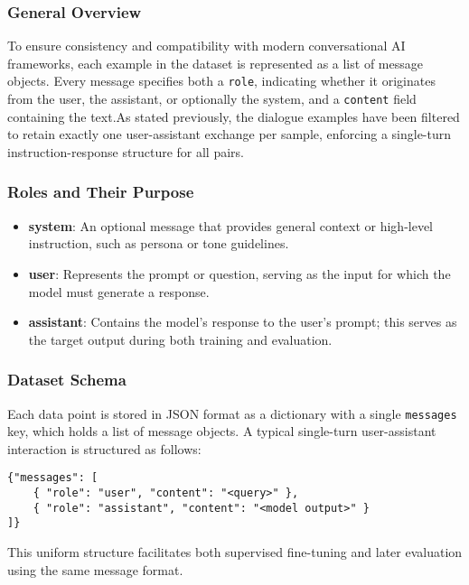 \subsubsection{General Overview}
To ensure consistency and compatibility with modern conversational AI frameworks, each example in the dataset is represented as a list of message objects. Every message specifies both a \texttt{role}, indicating whether it originates from the user, the assistant, or optionally the system, and a \texttt{content} field containing the text.As stated previously, the dialogue examples have been filtered to retain exactly one user-assistant exchange per sample, enforcing a single-turn instruction-response structure for all pairs.

\subsubsection{Roles and Their Purpose}
\begin{itemize}
\item \textbf{system}: An optional message that provides general context or high-level instruction, such as persona or tone guidelines.
\item \textbf{user}: Represents the prompt or question, serving as the input for which the model must generate a response.
\item \textbf{assistant}: Contains the model's response to the user's prompt; this serves as the target output during both training and evaluation.
\end{itemize}

\subsubsection{Dataset Schema}
Each data point is stored in JSON format as a dictionary with a single \texttt{messages} key, which holds a list of message objects. A typical single-turn user-assistant interaction is structured as follows:
\begin{lstlisting}[caption={User–assistant message pair}]
{"messages": [
    { "role": "user", "content": "<query>" },
    { "role": "assistant", "content": "<model output>" }
]}
\end{lstlisting}
This uniform structure facilitates both supervised fine-tuning and later evaluation using the same message format.

